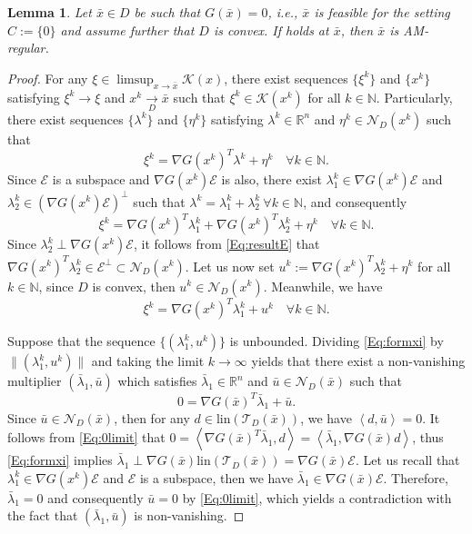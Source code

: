 \documentclass[11pt,a4paper,reqno]{amsart}
\newtheorem{lemma}[theorem]{Lemma}
\begin{document}
{\begin{lemma}\label{Lem:weakCQ}
    Let $\bar x \in D$ be such that $G(\bar x)=0$, i.e., $\bar x$ is feasible for the setting $C:=\{0\}$ and assume further that $D$ is convex. If  holds at $\bar x$, then $\bar x$ is AM-regular.
\end{lemma}
\begin{proof}
    For any $\xi\in \limsup_{x \to \bar x} \mathcal K(x)$, there exist sequences $\{\xi^k\}$ and $\{x^k\}$ satisfying $\xi^k \to \xi$ and $x^k \xrightarrow[D]{} \bar x$ such that $\xi^k \in \mathcal K(x^k)$ for all $k\in \mathbb N$. Particularly, there exist sequences $\{\lambda^k\}$ and $\{\eta^k\}$ satisfying $\lambda^k\in \mathbb R^n$ and $\eta^k\in \mathcal N_D(x^k)$ such that
\begin{equation*}
    \xi^k = \nabla G(x^k)^T \lambda ^k +\eta^k \quad \forall k\in \mathbb N.
\end{equation*}
Since $\mathcal E$ is a subspace and $\nabla G(x^k)\mathcal E$ is also, there exist $\lambda_1^k \in \nabla G(x^k)\mathcal E $ and $\lambda_2^k \in \left( \nabla G(x^k)\mathcal E \right)^{\perp}$ such that $\lambda^k=\lambda_1^k +\lambda_2^k \ \forall k\in \mathbb N$,
and consequently
\begin{equation*}
    \xi^k = \nabla G(x^k)^T \lambda_1 ^k + \nabla G(x^k)^T \lambda_2 ^k+ \eta^k \quad \forall k\in \mathbb N.
\end{equation*}
Since $\lambda_2^k \perp \nabla G(x^k)\mathcal E$, it follows from \eqref{Eq:resultE} that $\nabla G(x^k)^T \lambda_2^k \in \mathcal E^{\perp} \subset \mathcal N_D (x^k)$. Let us now set $u^k:=\nabla G(x^k)^T \lambda_2 ^k+ \eta^k$ for all $k\in \mathbb N$, since $D$ is convex, then $u^k\in \mathcal N_D(x^k)$. Meanwhile, we have
\begin{equation}\label{Eq:formxi}
    \xi^k = \nabla G(x^k)^T \lambda_1 ^k + u^k \quad \forall k\in \mathbb N.
\end{equation}

Suppose that the sequence $\{(\lambda_1^k, u^k)\}$ is unbounded. Dividing 
 \eqref{Eq:formxi} by $\|(\lambda_1^k, u^k)\|$ and taking the limit $k\to \infty$ yields that there exist a non-vanishing multiplier $(\bar \lambda_1, \bar u)$ which satisfies $\bar \lambda_1\in \mathbb R^n$ and $\bar u \in \mathcal N_D(\bar x)$ such that 
 \begin{equation}\label{Eq:0limit}
     0 =\nabla G (\bar x)^T \bar \lambda_1 + \bar u.
 \end{equation}
 Since $\bar u \in \mathcal N_D(\bar x)$, then for any $d\in \text{lin}(\mathcal T_D(\bar x))$, we have $\left<d, \bar u \right>=0$. It follows from \eqref{Eq:0limit} that
   $  0=\left<\nabla G (\bar x)^T \bar \lambda_1, d\right> = \left<\bar \lambda_1, \nabla G(\bar x)d \right>$,
 thus \eqref{Eq:formxi} implies $
     \bar \lambda_1 \perp \nabla G(\bar x) \text{lin}(\mathcal T_D(\bar x)) = \nabla G(\bar x) \mathcal E$.
 Let us recall that $\lambda_1^k \in \nabla G(x^k)\mathcal E$ and $\mathcal E$ is a subspace, then we have $\bar \lambda_1 \in \nabla G(\bar x) \mathcal E$. Therefore, $\bar \lambda_1 =0 $ and consequently $\bar u=0$ by \eqref{Eq:0limit}, which yields a contradiction with the fact that $(\bar \lambda_1, \bar u)$ is non-vanishing.


\end{proof}}
\end{document}
